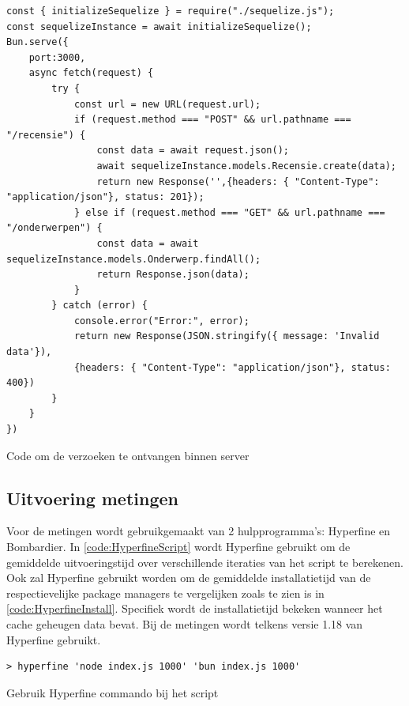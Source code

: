 \begin{listing}[H]
  \centering
  \begin{verbatim}
const { initializeSequelize } = require("./sequelize.js");
const sequelizeInstance = await initializeSequelize();
Bun.serve({
    port:3000,
    async fetch(request) {
        try {
            const url = new URL(request.url);
            if (request.method === "POST" && url.pathname === "/recensie") {
                const data = await request.json();
                await sequelizeInstance.models.Recensie.create(data);
                return new Response('',{headers: { "Content-Type": "application/json"}, status: 201});
            } else if (request.method === "GET" && url.pathname === "/onderwerpen") {
                const data = await sequelizeInstance.models.Onderwerp.findAll();
                return Response.json(data);
            }
        } catch (error) {
            console.error("Error:", error);
            return new Response(JSON.stringify({ message: 'Invalid data'}), 
            {headers: { "Content-Type": "application/json"}, status: 400})
        }
    }
})
\end{verbatim}
\caption{\label{code:BunServer}Code om de verzoeken te ontvangen binnen server}
\end{listing}
\subsection{Uitvoering metingen}
Voor de metingen wordt gebruikgemaakt van 2 hulpprogramma's: Hyperfine en Bombardier.
In \ref{code:HyperfineScript} wordt Hyperfine gebruikt om de gemiddelde uitvoeringstijd over verschillende iteraties van het script te berekenen.
Ook zal Hyperfine gebruikt worden om de gemiddelde installatietijd van de respectievelijke package managers te vergelijken zoals 
te zien is in \ref{code:HyperfineInstall}. Specifiek wordt de installatietijd bekeken wanneer het cache geheugen data bevat.
Bij de metingen wordt telkens versie 1.18 van Hyperfine gebruikt.
\begin{listing}[H]
  \centering
  \begin{verbatim}
> hyperfine 'node index.js 1000' 'bun index.js 1000'
      \end{verbatim}
      \caption{\label{code:HyperfineScript}Gebruik Hyperfine commando bij het script}
\end{listing}

